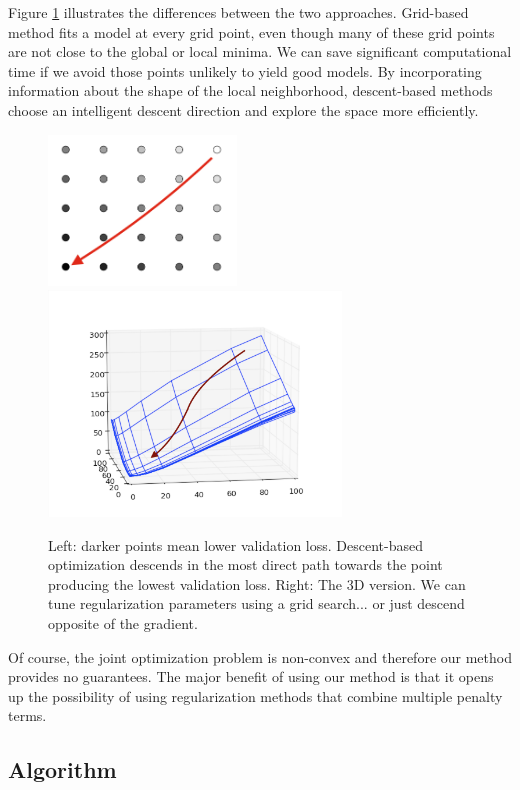 \documentclass[10pt,letterpaper]{article}
\begin{document}
Figure \ref{fig:compare} illustrates the differences between the two approaches. Grid-based method fits a model at every grid point, even though many of these grid points are not close to the global or local minima. We can save significant computational time if we avoid those points unlikely to yield good models. By incorporating information about the shape of the local neighborhood, descent-based methods choose an intelligent descent direction and explore the space more efficiently. 

\begin{figure}
\begin{center}
\includegraphics[height=40mm]{grid_search_vs_descent.png}
\includegraphics[height=60mm]{surface_in_regularization_parameters.png}
\end{center}
\caption{Left: darker points mean lower validation loss. Descent-based optimization descends in the most direct path towards the point producing the lowest validation loss. Right: The 3D version. We can tune regularization parameters using a grid search... or just descend opposite of the gradient.}
\label{fig:compare}
\end{figure}

Of course, the joint optimization problem is non-convex and therefore our method provides no guarantees. The major benefit of using our method is that it opens up the possibility of using regularization methods that combine multiple penalty terms.

\subsection{Algorithm}
\end{document}
